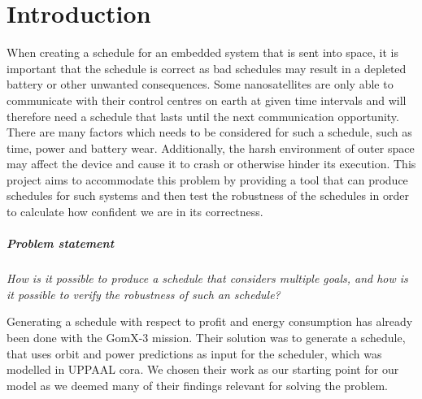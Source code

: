 \chapter{Introduction}\label{cha:intro}
When creating a schedule for an embedded system that is sent into space, it is important that the schedule is correct as bad schedules may result in a depleted battery or other unwanted consequences. 
Some nanosatellites are only able to communicate with their control centres on earth at given time intervals and will therefore need a schedule that lasts until the next communication opportunity.
There are many factors which needs to be considered for such a schedule, such as time, power and battery wear. 
Additionally, the harsh environment of outer space may affect the device and cause it to crash or otherwise hinder its execution. 
This project aims to accommodate this problem by providing a tool that can produce schedules for such systems and then test the robustness of the schedules in order to calculate how confident we are in its correctness.

\paragraph{Problem statement}
\textit{How is it possible to produce a schedule that considers multiple goals, and how is it possible to verify the robustness of such an schedule?}

Generating a schedule with respect to profit and energy consumption has already been done with the GomX-3 mission\cite{gomx3}. 
Their solution was to generate a schedule, that uses orbit and power predictions as input for the scheduler, which was modelled in UPPAAL \gls{cora}.
We chosen their work as our starting point for our model as we deemed many of their findings relevant for solving the problem.

